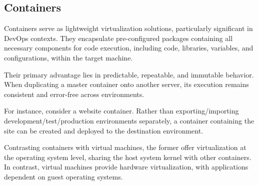 \subsection{Containers}
Containers serve as lightweight virtualization solutions, particularly significant in DevOps contexts. 
They encapsulate pre-configured packages containing all necessary components for code execution, including code, libraries, variables, and configurations, within the target machine.

Their primary advantage lies in predictable, repeatable, and immutable behavior. 
When duplicating a master container onto another server, its execution remains consistent and error-free across environments.

For instance, consider a website container. 
Rather than exporting/importing development/test/production environments separately, a container containing the site can be created and deployed to the destination environment.

Contrasting containers with virtual machines, the former offer virtualization at the operating system level, sharing the host system kernel with other containers. 
In contrast, virtual machines provide hardware virtualization, with applications dependent on guest operating systems.

